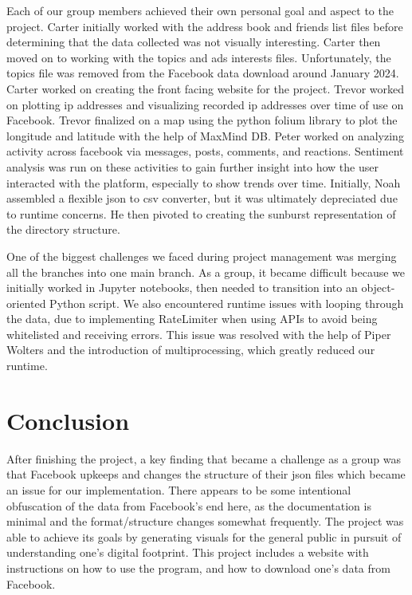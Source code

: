 \documentclass[conference, letterpaper, 11pt]{IEEEtran}
\begin{document}
Each of our group members achieved their own personal goal and aspect to the project. Carter initially worked with the address book and friends list files before determining that the data collected was not visually interesting. Carter then moved on to working with the topics and ads interests files. Unfortunately, the topics file was removed from the Facebook data download around January 2024. Carter worked on creating the front facing website for the project. Trevor worked on plotting ip addresses and visualizing recorded ip addresses over time of use on Facebook. Trevor finalized on a map using the python folium library to plot the longitude and latitude with the help of MaxMind DB. Peter worked on analyzing activity across facebook via messages, posts, comments, and reactions. Sentiment analysis was run on these activities to gain further insight into how the user interacted with the platform, especially to show trends over time. Initially, Noah assembled a flexible json to csv converter, but it was ultimately depreciated due to runtime concerns. He then pivoted to creating the sunburst representation of the directory structure.

One of the biggest challenges we faced during project management was merging all the branches into one main branch. As a group, it became difficult because we initially worked in Jupyter notebooks, then needed to transition into an object-oriented Python script. We also encountered runtime issues with looping through the data, due to implementing RateLimiter when using APIs to avoid being whitelisted and receiving errors. This issue was resolved with the help of Piper Wolters and the introduction of multiprocessing, which greatly reduced our runtime.

\section{Conclusion} \label{CO}
After finishing the project, a key finding that became a challenge as a group was that Facebook upkeeps and changes the structure of their json files which became an issue for our implementation. There appears to be some intentional obfuscation of the data from Facebook's end here, as the documentation is minimal and the format/structure changes somewhat frequently. The project was able to achieve its goals by generating visuals for the general public in pursuit of understanding one's digital footprint. This project includes a website with instructions on how to use the program, and how to download one's data from Facebook.
\end{document}
